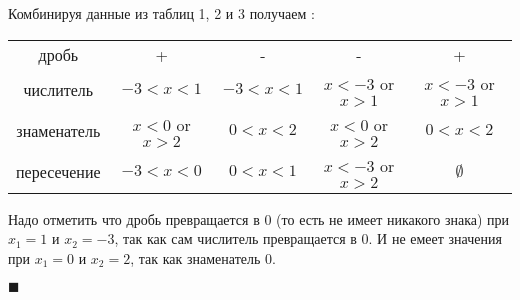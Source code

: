 \documentclass{amsart}
\begin{document}
Комбинируя данные из таблиц 1, 2 и 3 получаем :

\begin{center}
 \begin{tabular}{c c c c c}
 \hline
     дробь         &      +              &       -          &        -                 &      +                 \\
	 числитель     & $-3 < x < 1$        &    $-3 < x < 1$  &   $x < -3$ or $x > 1$   &  $x < -3$ or $x > 1$  \\
	 знаменатель   & $x < 0$ or $x > 2$ &    $0 < x < 2$   &   $x < 0$ or $x > 2$    &  $0 < x < 2$            \\
	 пересечение   & $-3 < x < 0$        &    $0 < x < 1 $  &   $x < -3 $ or $x > 2$   &  $\emptyset$            \\
  \hline
 \end{tabular}
\end{center}

Надо отметить что дробь превращается в 0 (то есть не имеет никакого знака) при $x_1 = 1$ и $x_2 = -3$, так как сам числитель превращается в 0. И не емеет значения при $x_1 = 0$ и $x_2 = 2$, так как знаменатель 0.

$\blacksquare$
\end{document}
